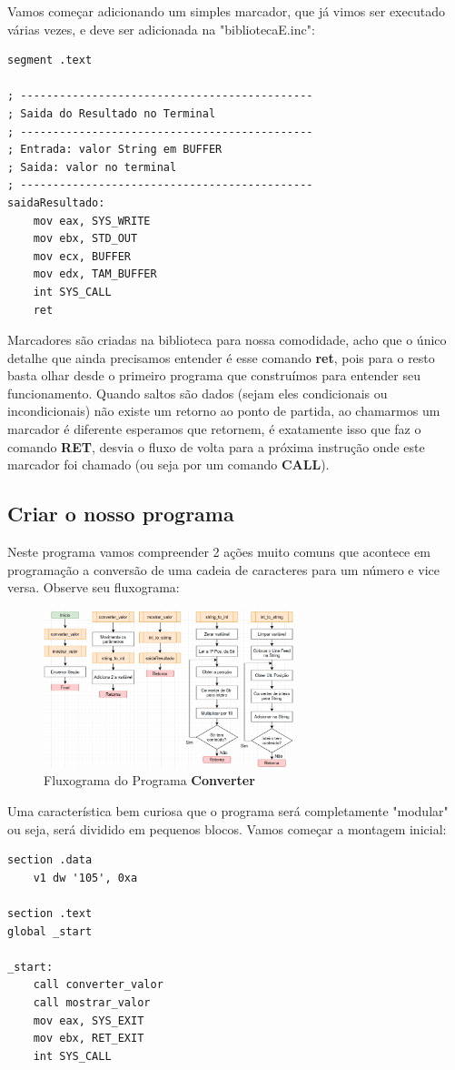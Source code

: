 Vamos começar adicionando um simples marcador, que já vimos ser executado várias vezes, e deve ser adicionada na "bibliotecaE.inc":

\begin{lstlisting}[]
segment .text

; ---------------------------------------------
; Saida do Resultado no Terminal
; ---------------------------------------------
; Entrada: valor String em BUFFER
; Saida: valor no terminal
; ---------------------------------------------
saidaResultado:
	mov eax, SYS_WRITE
	mov ebx, STD_OUT
	mov ecx, BUFFER
	mov edx, TAM_BUFFER
	int SYS_CALL
	ret
\end{lstlisting}

Marcadores são criadas na biblioteca para nossa comodidade, acho que o único detalhe que ainda precisamos entender é esse comando \textbf{ret}, pois para o resto basta olhar desde o primeiro programa que construímos para entender seu funcionamento. Quando saltos são dados (sejam eles condicionais ou incondicionais) não existe um retorno ao ponto de partida, ao chamarmos um marcador é diferente esperamos que retornem, é exatamente isso que faz o comando \textbf{RET}, desvia o fluxo de volta para a próxima instrução onde este marcador foi chamado (ou seja por um comando \textbf{CALL}).

\subsection{Criar o nosso programa}
Neste programa vamos compreender 2 ações muito comuns que acontece em programação a conversão de uma cadeia de caracteres para um número e vice versa. Observe seu fluxograma:
\begin{figure}[H]
	\centering
	\includegraphics[width=0.65\textwidth]{Pictures/cap01/programa4}
	\caption{Fluxograma do Programa \textbf{Converter}}
\end{figure}

Uma característica bem curiosa que o programa será completamente "modular" ou seja, será dividido em pequenos blocos. Vamos começar a montagem inicial:
\begin{lstlisting}[]
section .data
	v1 dw '105', 0xa

section .text
global _start

_start:
	call converter_valor
	call mostrar_valor
	mov eax, SYS_EXIT
	mov ebx, RET_EXIT
	int SYS_CALL
\end{lstlisting}

